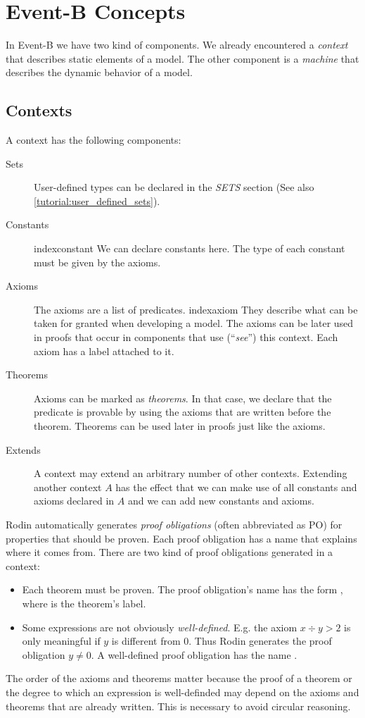 \section{Event-B Concepts}
\label{tut_eventb_concepts}

In Event-B we have two kind of components.
We already encountered a \emph{context} that describes static elements of a model.
The other component is a \emph{machine} that describes the dynamic behavior of a model.

\subsection{Contexts}
\label{tut_concepts_contexts}

A context has the following components:
\begin{description}
\item[Sets]
  User-defined types can be declared in the \textsl{SETS} section
  (See also \ref{tutorial:user_defined_sets}).
\item[Constants]
index{constant}
  We can declare constants here. The type of each constant must be given
  by the axioms.
\item[Axioms] The axioms are a list of predicates. 
index{axiom}
  They describe what can be taken for granted when developing a model.
  The axioms can be later used in proofs that occur in components that
  use (``\emph{see}'') this context.
  Each axiom has a label attached to it.
\item[Theorems]
  Axioms can be marked as \emph{theorems}. In that case, we declare that
  the predicate is provable by using the axioms that are written 
  before the theorem.
  Theorems can be used later in proofs just like the axioms.
\item[Extends]
  A context may extend an arbitrary number of other contexts.
  Extending another context $A$ has the effect that we can make use of
  all constants and axioms declared in $A$ and we can add new constants
  and axioms.
\end{description}
Rodin automatically generates \emph{proof obligations} (often abbreviated as PO) for properties that
should be proven. Each proof obligation has a name that explains where it comes from.
There are two kind of proof obligations generated in a context:
\begin{itemize}
  \item Each theorem must be proven. The proof obligation's name has the form 
    , where  is the theorem's label.
  \item Some expressions are not obviously \emph{well-defined}.
    E.g. the axiom $x \div y > 2$ is only meaningful if $y$ is different from 0.
    Thus Rodin generates the proof obligation $y\neq 0$.
    A well-defined proof obligation has the name .
\end{itemize}
The order of the axioms and theorems matter because the proof of a theorem or the degree to which an expression is well-definded may depend on the axioms and theorems that are already written. This is necessary to avoid circular reasoning.


